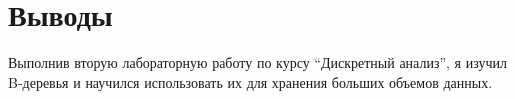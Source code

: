 \section{Выводы}
Выполнив вторую лабораторную работу по курсу \enquote{Дискретный анализ}, я изучил B-деревья и научился использовать их для хранения больших объемов данных.
\pagebreak
